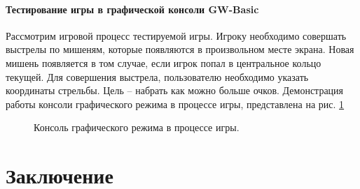 \documentclass[12pt]{article}
\begin{document}
		\subsection{Тестирование игры в графической консоли GW-Basic}
		\hspace{\parindent} Рассмотрим игровой процесс тестируемой игры. Игроку необходимо совершать выстрелы по мишеням, которые появляются в произвольном месте экрана. Новая мишень появляется в том случае, если игрок попал в центральное кольцо текущей. Для совершения выстрела, пользователю необходимо указать координаты стрельбы. Цель -- набрать как можно больше очков. Демонстрация работы консоли графического режима в процессе игры, представлена на рис. \ref{fig:game}\\
		\begin{figure}[h]
			\caption{Консоль графического режима в процессе игры.}
			\label{fig:game}
		\end{figure}
	\newpage	
	
	\part*{\centering Заключение}
	\newpage
	\nocite{*}
			
	
	
	\newpage
	\tableofcontents %

\end{document}
